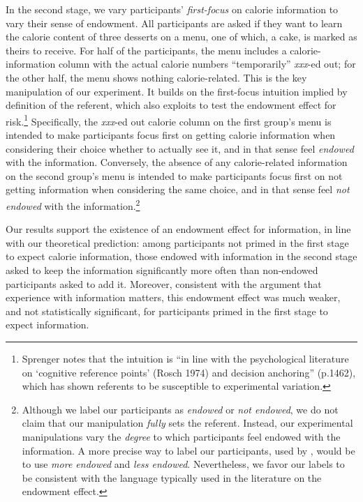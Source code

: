 In the second stage, we vary participants' \emph{first-focus} on calorie information to vary their sense of endowment. All participants are asked if they want to learn the calorie content of three desserts on a menu, one of which, a cake, is marked as theirs to receive. For half of the participants, the menu includes a calorie-information column with the actual calorie numbers \enquote{temporarily} \emph{xxx}-ed out; for the other half, the menu shows nothing calorie-related. This is the key manipulation of our experiment. It builds on the first-focus intuition implied by  definition of the referent, which \citet{sprengerEndowmentEffectRisk2015} also exploits to test the endowment effect for risk.\footnote{Sprenger notes that the intuition is \enquote{in line with the psychological literature on \enquote{cognitive reference points} (Rosch 1974) and decision anchoring} (p.1462), which has shown referents to be susceptible to experimental variation.} Specifically, the \emph{xxx}-ed out calorie column on the first group's menu is intended to make participants focus first on getting calorie information when considering their choice whether to actually see it, and in that sense feel \emph{endowed} with the information. Conversely, the absence of any calorie-related information on the second group's menu is intended to make participants focus first on not getting information when considering the same choice, and in that sense feel \emph{not endowed} with the information.\footnote{Although we label our participants as \emph{endowed} or \emph{not endowed}, we do not claim that our manipulation \emph{fully} sets the referent. Instead, our experimental manipulations vary the \emph{degree} to which participants feel endowed with the information. A more precise way to label our participants, used by \citet{heffetzEndowmentEffectExpectations2014}, would be to use \emph{more endowed} and \emph{less endowed}. Nevertheless, we favor our labels to be consistent with the language typically used in the literature on the endowment effect.}

Our results support the existence of an endowment effect for information, in line with our theoretical prediction: among participants not primed in the first stage to expect calorie information, those endowed with information in the second stage asked to keep the information significantly more often than non-endowed participants asked to add it. Moreover, consistent with the argument that experience with information matters, this endowment effect was much weaker, and not statistically significant, for participants primed in the first stage to expect information.

